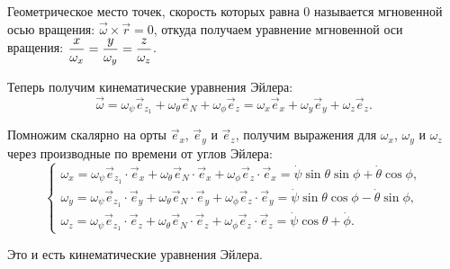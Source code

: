 Геометрическое место точек, скорость которых равна 0 называется мгновенной осью
вращения: \( \vec{\omega}\times\vec{r} = 0 \), откуда получаем уравнение
мгновенной оси вращения: \( \displaystyle \frac{x}{\omega_x} = \frac{y}{\omega_y} =
\frac{z}{\omega_z} \).

Теперь получим кинематические уравнения Эйлера:
\[
    \vec{\omega} = \omega_\psi\vec{e}_{z_1} + \omega_\theta\vec{e}_N +
    \omega_\phi\vec{e}_z = \omega_x\vec{e}_x + \omega_y\vec{e}_y +
    \omega_z\vec{e}_z.
\]

Помножим скалярно на орты \( \vec{e}_x \), \( \vec{e}_y \) и \( \vec{e}_z \),
получим выражения для \( \omega_x \), \( \omega_y \) и \( \omega_z \) через
производные по времени от углов Эйлера:
\[
    \left\{ \begin{array}{l}
        \omega_x = \omega_\psi\vec{e}_{z_1}\cdot\vec{e}_x +
        \omega_\theta\vec{e}_N\cdot\vec{e}_x +\omega_\phi\vec{e}_z\cdot\vec{e}_x
        = \dot{\psi}\sin\theta\sin\phi + \dot{\theta}\cos\phi, \\
        \omega_y = \omega_\psi\vec{e}_{z_1}\cdot\vec{e}_y +
        \omega_\theta\vec{e}_N\cdot\vec{e}_y +\omega_\phi\vec{e}_z\cdot\vec{e}_y
        = \dot{\psi}\sin\theta\cos\phi - \dot{\theta}\sin\phi, \\
        \omega_z = \omega_\psi\vec{e}_{z_1}\cdot\vec{e}_z +
        \omega_\theta\vec{e}_N\cdot\vec{e}_z +\omega_\phi\vec{e}_z\cdot\vec{e}_z
        = \dot{\psi}\cos\theta + \dot\phi.
    \end{array} \right.
\]

Это и есть кинематические уравнения Эйлера.
\newpage

